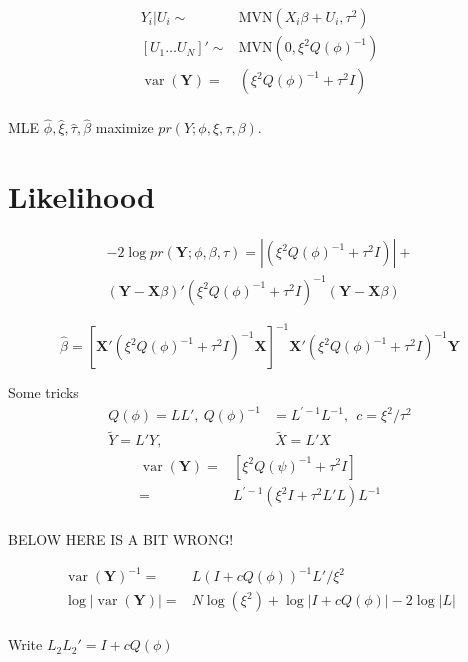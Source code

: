 \documentclass[12pt]{article}
\DeclareMathOperator{\var}{var}
\begin{document}
\begin{align*}
Y_i| U_i \sim & \text{MVN}(X_i\beta + U_i, \tau^2 )\\
[U_1 \ldots U_N]' \sim  & \text{MVN}(0, \xi^2 Q(\phi)^{-1})\\
\var(\mathbf{Y})  = &  ( \xi^2 Q(\phi)^{-1} + \tau^2 I  )  \\
\end{align*}

MLE  $\hat\phi, \hat\xi, \hat\tau,\hat\beta$  maximize $pr(Y ;
\phi,\xi,\tau,\beta)$.

\section*{Likelihood}
\begin{multline*}
-2 \log pr(\mathbf{Y};\phi,\beta,\tau) = 
| (\xi^2  Q(\phi)^{-1} + \tau^2 I  ) | + \\
( \mathbf{Y} -\mathbf{X}\beta)  '   
  (\xi^2  Q(\phi)^{-1} + \tau^2 I  )^{-1} 
(\mathbf{Y} - \mathbf{X}\beta) 
\end{multline*}

\[
\hat\beta = [ \mathbf{X}' 
(  \xi^2  Q(\phi)^{-1} + \tau^2 I )^{-1}   \mathbf{X}]^{-1}  
\mathbf{X}'(\xi^2  Q(\phi)^{-1} +
\tau^2 I  )^{-1} \mathbf{Y}
\]

Some tricks
\begin{align*}
 Q(\phi) = L L',\   Q(\phi)^{-1} &=L^{\prime-1} L^{-1}, \ \  c = \xi^2/\tau^2 \\
\tilde Y = L' Y,&  \  \tilde X = L' X
\end{align*}
\begin{align*}
\var(\mathbf{Y}) =&  [ \xi^2 Q(\psi)^{-1} +  \tau^2 I] \\
= &    L^{\prime -1}(  \xi^2I +   \tau^2 L'L  ) L^{-1}\\
\end{align*}

BELOW HERE IS A BIT WRONG!

\begin{align*}

\var(\mathbf{Y})^{-1} = &    L(  I + c  Q(\phi)  )^{-1} L' / \xi^2\\
\log |\var(\mathbf{Y})| = & N \log(\xi^2) + \log |I + c Q(\phi)| - 
2 \log |L|\\ 
\end{align*}

Write $L_2 L_2' = I + c   Q(\phi) $
\end{document}
